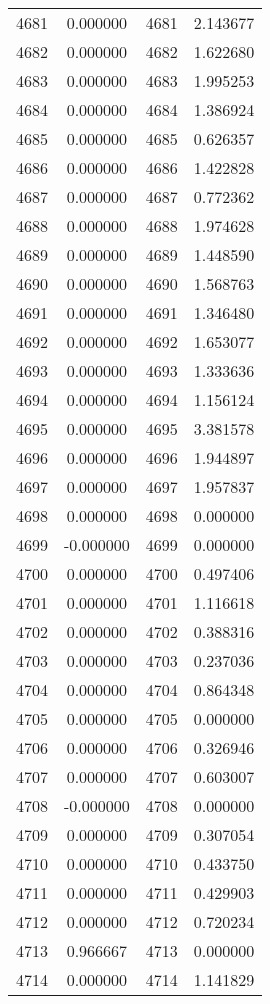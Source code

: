 \documentclass[12pt]{article}
\begin{document}
\begin{longtable}{@{}cccc@{}}
4681 & 0.000000 & 4681 & 2.143677 \\
4682 & 0.000000 & 4682 & 1.622680 \\
4683 & 0.000000 & 4683 & 1.995253 \\
4684 & 0.000000 & 4684 & 1.386924 \\
4685 & 0.000000 & 4685 & 0.626357 \\
4686 & 0.000000 & 4686 & 1.422828 \\
4687 & 0.000000 & 4687 & 0.772362 \\
4688 & 0.000000 & 4688 & 1.974628 \\
4689 & 0.000000 & 4689 & 1.448590 \\
4690 & 0.000000 & 4690 & 1.568763 \\
4691 & 0.000000 & 4691 & 1.346480 \\
4692 & 0.000000 & 4692 & 1.653077 \\
4693 & 0.000000 & 4693 & 1.333636 \\
4694 & 0.000000 & 4694 & 1.156124 \\
4695 & 0.000000 & 4695 & 3.381578 \\
4696 & 0.000000 & 4696 & 1.944897 \\
4697 & 0.000000 & 4697 & 1.957837 \\
4698 & 0.000000 & 4698 & 0.000000 \\
4699 & -0.000000 & 4699 & 0.000000 \\
4700 & 0.000000 & 4700 & 0.497406 \\
4701 & 0.000000 & 4701 & 1.116618 \\
4702 & 0.000000 & 4702 & 0.388316 \\
4703 & 0.000000 & 4703 & 0.237036 \\
4704 & 0.000000 & 4704 & 0.864348 \\
4705 & 0.000000 & 4705 & 0.000000 \\
4706 & 0.000000 & 4706 & 0.326946 \\
4707 & 0.000000 & 4707 & 0.603007 \\
4708 & -0.000000 & 4708 & 0.000000 \\
4709 & 0.000000 & 4709 & 0.307054 \\
4710 & 0.000000 & 4710 & 0.433750 \\
4711 & 0.000000 & 4711 & 0.429903 \\
4712 & 0.000000 & 4712 & 0.720234 \\
4713 & 0.966667 & 4713 & 0.000000 \\
4714 & 0.000000 & 4714 & 1.141829 \\

\end{longtable}
\end{document}
